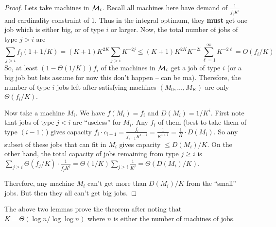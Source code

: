 	\begin{proof}
		Lets take machines in $\mathcal{M}_i$. Recall all machines here have demand of $\frac{1}{f_iK^i}$ and cardinality constraint of $1$.
		Thus in the integral optimum, they {\bf must} get one job which is either big, or of type $i$ or larger. 
		Now, the total number of jobs of type $j > i$ are 
		\[
		\sum_{j>i} f_j(1+1/K) = (K+1)K^{2K} \sum_{j > i} K^{-2j} \leq  (K+1)K^{2K}K^{-2i} \sum_{\ell=1}^\infty K^{-2\ell} = O\left(f_i/K\right)
		\]
		So, at least $(1 - \Theta(1/K))f_i$ of the machines in $\mathcal{M}_i$ get a job of type $i$ (or a big job but lets assume for now this don't happen -- can be ma).
		Therefore, the number of type $i$ jobs left after satisfying machines $(M_0,\ldots,M_K)$ are only $\Theta(f_i/K)$.
		
		
		Now take a machine $M_i$. We have $f(M_i) = f_i$ and $D(M_i) = 1/K^i$. 
		First note that jobs of type $j < i$ are ``useless'' for $M_i$. Any $f_i$ of them (best to take them of type $(i-1)$)  gives capacity $f_i\cdot c_{i-1}  = \frac{f_i}{f_{i-1}K^{i-1}} = \frac{1}{K^{i+1}} =  \frac{1}{K}\cdot D(M_i)$. So any subset of these jobs that can fit in $M_i$ gives capacity $\leq D(M_i)/K$.
		On the other hand, the total capacity of jobs remaining from type $j \geq i$ is  $\sum_{j\geq i} \Theta(f_j/K)\cdot \frac{1}{f_jK^j} = \Theta(1/K)\sum_{j\geq i} \frac{1}{K^j} = \Theta(D(M_i)/K)$.
		
		Therefore, any machine $M_i$ can't get more than $D(M_i)/K$ from the ``small'' jobs. But then they all can't get big jobs. 
	\end{proof}
	The above two lemmas prove the theorem after noting that $K = \Theta(\log n/\log\log n)$ where $n$ is either the number of machines of jobs.
